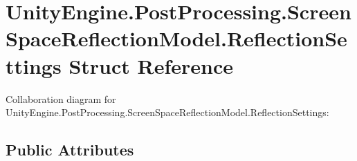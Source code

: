 \hypertarget{struct_unity_engine_1_1_post_processing_1_1_screen_space_reflection_model_1_1_reflection_settings}{}\section{Unity\+Engine.\+Post\+Processing.\+Screen\+Space\+Reflection\+Model.\+Reflection\+Settings Struct Reference}
\label{struct_unity_engine_1_1_post_processing_1_1_screen_space_reflection_model_1_1_reflection_settings}


Collaboration diagram for Unity\+Engine.\+Post\+Processing.\+Screen\+Space\+Reflection\+Model.\+Reflection\+Settings\+:
\subsection*{Public Attributes}
